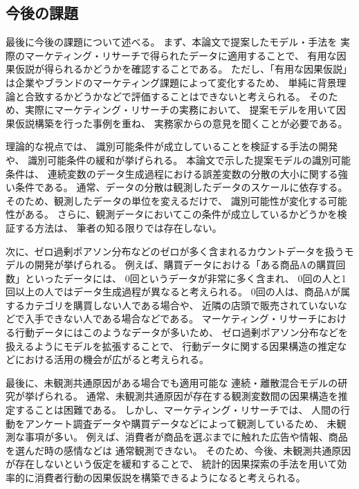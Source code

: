 
\subsection{今後の課題}

最後に今後の課題について述べる。
まず、本論文で提案したモデル・手法を
実際のマーケティング・リサーチで得られたデータに適用することで、
有用な因果仮説が得られるかどうかを確認することである。
ただし、「有用な因果仮説」は企業やブランドのマーケティング課題によって変化するため、
単純に背景理論と合致するかどうかなどで評価することはできないと考えられる。
そのため、実際にマーケティング・リサーチの実務において、
提案モデルを用いて因果仮説構築を行った事例を重ね、
実務家からの意見を聞くことが必要である。

理論的な視点では、
識別可能条件が成立していることを検証する手法の開発や、
識別可能条件の緩和が挙げられる。
本論文で示した提案モデルの識別可能条件は、
連続変数のデータ生成過程における誤差変数の分散の大小に関する強い条件である。
通常、データの分散は観測したデータのスケールに依存する。
そのため、観測したデータの単位を変えるだけで、
識別可能性が変化する可能性がある。
さらに、観測データにおいてこの条件が成立しているかどうかを検証する方法は、
筆者の知る限りでは存在しない。

次に、ゼロ過剰ポアソン分布などのゼロが多く含まれるカウントデータを扱うモデルの開発が挙げられる。
例えば、購買データにおける「ある商品Aの購買回数」といったデータには、
0回というデータが非常に多く含まれ、
0回の人と1回以上の人ではデータ生成過程が異なると考えられる。
0回の人は、商品Aが属するカテゴリを購買しない人である場合や、
近隣の店頭で販売されていないなどで入手できない人である場合などである。
マーケティング・リサーチにおける行動データにはこのようなデータが多いため、
ゼロ過剰ポアソン分布などを扱えるようにモデルを拡張することで、
行動データに関する因果構造の推定などにおける活用の機会が広がると考えられる。

最後に、未観測共通原因がある場合でも適用可能な
連続・離散混合モデルの研究が挙げられる。
通常、未観測共通原因が存在する観測変数間の因果構造を推定することは困難である。
しかし、マーケティング・リサーチでは、
人間の行動をアンケート調査データや購買データなどによって観測しているため、
未観測な事項が多い。
例えば、消費者が商品を選ぶまでに触れた広告や情報、商品を選んだ時の感情などは
通常観測できない。
そのため、今後、未観測共通原因が存在しないという仮定を緩和することで、
統計的因果探索の手法を用いて効率的に消費者行動の因果仮説を構築できるようになると考えられる。

